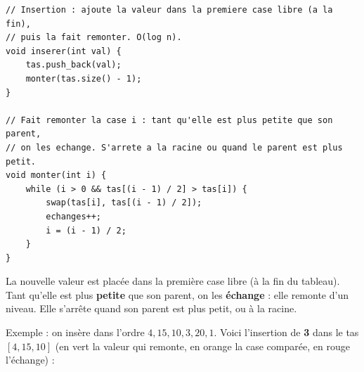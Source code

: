 \documentclass[11pt,a4paper]{article}
\begin{document}
\begin{lstlisting}[caption={Insertion (\texttt{inserer} et \texttt{monter}).}]
// Insertion : ajoute la valeur dans la premiere case libre (a la fin),
// puis la fait remonter. O(log n).
void inserer(int val) {
    tas.push_back(val);
    monter(tas.size() - 1);
}

// Fait remonter la case i : tant qu'elle est plus petite que son parent,
// on les echange. S'arrete a la racine ou quand le parent est plus petit.
void monter(int i) {
    while (i > 0 && tas[(i - 1) / 2] > tas[i]) {
        swap(tas[i], tas[(i - 1) / 2]);
        echanges++;
        i = (i - 1) / 2;
    }
}
\end{lstlisting}

La nouvelle valeur est placée dans la première case libre (à la fin du tableau). Tant
qu'elle est plus \textbf{petite} que son parent, on les \textbf{échange} : elle remonte d'un
niveau. Elle s'arrête quand son parent est plus petit, ou à la racine.

Exemple : on insère dans l'ordre $4, 15, 10, 3, 20, 1$. Voici l'insertion de \textbf{3}
dans le tas $[4, 15, 10]$ (en vert la valeur qui remonte, en orange la case comparée, en
rouge l'échange) :
\end{document}
